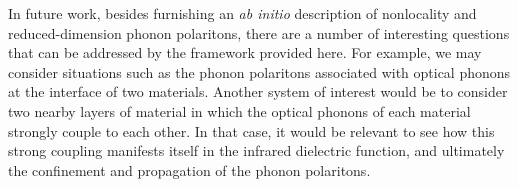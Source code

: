 \documentclass[aps,prb,twocolumn,
	groupedaddress,superscriptaddress,
	amsfonts,amssymb,amsmath,floatfix,
	citeautoscript]{revtex4-1}
\begin{document}
In future work, besides furnishing an \emph{ab initio} description of nonlocality and reduced-dimension phonon polaritons, there are a number of interesting questions that can be addressed by the framework provided here. For example, we may consider situations such as the phonon polaritons associated with optical phonons at the interface of two materials. Another system of interest would be to consider two nearby layers of material in which the optical phonons of each material strongly couple to each other. In that case, it would be relevant to see how this strong coupling manifests itself in the infrared dielectric function, and ultimately the confinement and propagation of the phonon polaritons.



\end{document}
